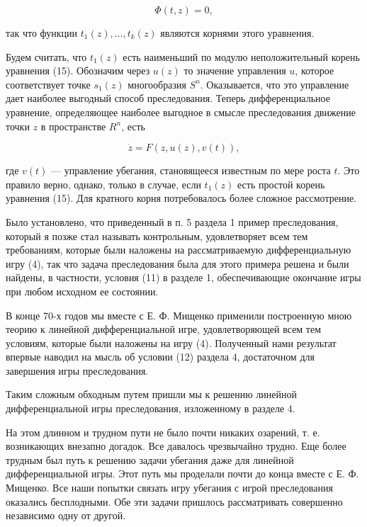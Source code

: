 \documentclass[10pt]{article}
\begin{document}
\[
\Phi \left( {t,z}\right)  = 0, \tag{15}
\]

так что функции \({t}_{1}\left( z\right),\ldots,{t}_{k}\left( z\right)\) являются корнями этого уравнения.

Будем считать, что \({t}_{1}\left( z\right)\) есть наименьший по модулю неположительный корень уравнения (15). Обозначим через \(u\left( z\right)\) то значение управления \(u\), которое соответствует точке \({s}_{1}\left( z\right)\) многообразия \({S}^{n}\). Оказывается, что это управление дает наиболее выгодный способ преследования. Теперь дифференциальное уравнение, определяющее наиболее выгодное в смысле преследования движение точки \(z\) в пространстве \({R}^{n}\), есть

\[
\dot{z} = F\left( {z,u\left( z\right),v\left( t\right) }\right), \tag{16}
\]

где \(v\left( t\right)\) — управление убегания, становящееся известным по мере роста \(t\). Это правило верно, однако, только в случае, если \({t}_{1}\left( z\right)\) есть простой корень уравнения (15). Для кратного корня потребовалось более сложное рассмотрение.

Было установлено, что приведенный в п. 5 раздела 1 пример преследования, который я позже стал называть контрольным, удовлетворяет всем тем требованиям, которые были наложены на рассматриваемую дифференциальную игру (4), так что задача преследования была для этого примера решена и были найдены, в частности, условия (11) в разделе 1, обеспечивающие окончание игры при любом исходном ее состоянии.

В конце 70-х годов мы вместе с Е. Ф. Мищенко применили построенную мною теорию к линейной дифференциальной игре, удовлетворяющей всем тем условиям, которые были наложены на игру (4). Полученный нами результат впервые наводил на мысль об условии (12) раздела 4, достаточном для завершения игры преследования.

Таким сложным обходным путем пришли мы к решению линейной дифференциальной игры преследования, изложенному в разделе 4.

На этом длинном и трудном пути не было почти никаких озарений, т. е. возникающих внезапно догадок. Все давалось чрезвычайно трудно. Еще более трудным был путь к решению задачи убегания даже для линейной дифференциальной игры. Этот путь мы проделали почти до конца вместе с Е. Ф. Мищенко. Все наши попытки связать игру убегания с игрой преследования оказались бесплодными. Обе эти задачи пришлось рассматривать совершенно независимо одну от другой.
\end{document}
